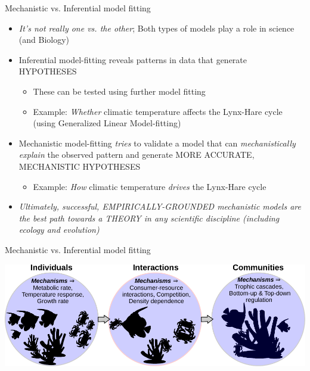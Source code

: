 \documentclass[xcolor=x11names,compress]{beamer}
\renewcommand{\(}{\begin{columns}}
\renewcommand{\)}{\end{columns}}
\newcommand{\<}[1]{\begin{column}{#1}}
\renewcommand{\>}{\end{column}}
\begin{document}
\begin{frame}{Mechanistic vs. Inferential model fitting}

	\begin{itemize}[<+->]\itemsep10pt
		\item {\it It's not really one vs. the other}; Both types of models play a role in science (and Biology)
		\item Inferential model-fitting reveals patterns in data that generate HYPOTHESES 
 		\begin{itemize}
			\item These can be tested using further model fitting
			\item Example: {\it Whether} climatic temperature affects the Lynx-Hare cycle (using Generalized Linear Model-fitting)
		\end{itemize} 

		\item Mechanistic model-fitting {\it tries} to validate a model that can {\it mechanistically explain} the observed pattern and generate MORE ACCURATE, MECHANISTIC HYPOTHESES
		\begin{itemize}
			\item Example: {\it How} climatic temperature {\it drives} the Lynx-Hare cycle
		\end{itemize} 
		\item \it Ultimately, successful, EMPIRICALLY-GROUNDED mechanistic models are the best path towards a THEORY in any scientific discipline (including ecology and evolution)  
	  \end{itemize}
 
 
 \end{frame}

\begin{frame}{Mechanistic vs. Inferential model fitting}
	 
  \begin{center}
	  \includegraphics[width=\textwidth]{Mechanisms.pdf}
  \end{center} 
 
 \end{frame}
\end{document}
